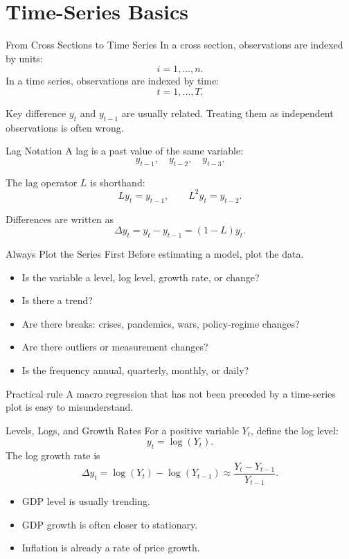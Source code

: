 \documentclass[11pt,aspectratio=169]{beamer}
\begin{document}
\section{Time-Series Basics}

\begin{frame}{From Cross Sections to Time Series}
  In a cross section, observations are indexed by units:
  \[
    i=1,\ldots,n.
  \]
  In a time series, observations are indexed by time:
  \[
    t=1,\ldots,T.
  \]

  \begin{block}{Key difference}
    \(y_t\) and \(y_{t-1}\) are usually related. Treating them as independent observations is often wrong.
  \end{block}
\end{frame}

\begin{frame}{Lag Notation}
  A lag is a past value of the same variable:
  \[
    y_{t-1},\quad y_{t-2},\quad y_{t-3}.
  \]

  The lag operator \(L\) is shorthand:
  \[
    Ly_t = y_{t-1},\qquad L^2y_t=y_{t-2}.
  \]

  Differences are written as
  \[
    \Delta y_t = y_t-y_{t-1}=(1-L)y_t.
  \]
\end{frame}

\begin{frame}{Always Plot the Series First}
  Before estimating a model, plot the data.

  \begin{itemize}
    \item Is the variable a level, log level, growth rate, or change?
    \item Is there a trend?
    \item Are there breaks: crises, pandemics, wars, policy-regime changes?
    \item Are there outliers or measurement changes?
    \item Is the frequency annual, quarterly, monthly, or daily?
  \end{itemize}

  \begin{block}{Practical rule}
    A macro regression that has not been preceded by a time-series plot is easy to misunderstand.
  \end{block}
\end{frame}

\begin{frame}{Levels, Logs, and Growth Rates}
  For a positive variable \(Y_t\), define the log level:
  \[
    y_t=\log(Y_t).
  \]
  The log growth rate is
  \[
    \Delta y_t
    =
    \log(Y_t)-\log(Y_{t-1})
    \approx
    \frac{Y_t-Y_{t-1}}{Y_{t-1}}.
  \]

  \begin{itemize}
    \item GDP level is usually trending.
    \item GDP growth is often closer to stationary.
    \item Inflation is already a rate of price growth.
  \end{itemize}
\end{frame}
\end{document}
